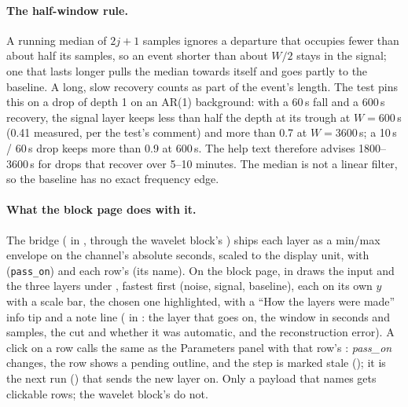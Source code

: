 \paragraph{The half-window rule.} A running median of $2j+1$ samples ignores a departure that
occupies fewer than about half its samples, so an event shorter than about $W/2$ stays in the
signal; one that lasts longer pulls the median towards itself and goes partly to the baseline.
A long, slow recovery counts as part of the event's length. The test
 pins this on a
drop of depth 1 on an AR(1) background: with a 60\,s fall and a 600\,s recovery, the signal
layer keeps less than half the depth at its trough at $W = 600$\,s (0.41 measured, per the
test's comment) and more than 0.7 at $W = 3600$\,s; a 10\,s / 60\,s drop keeps more than 0.9
at 600\,s. The help text therefore advises 1800--3600\,s for drops that recover over 5--10
minutes. The median is not a linear filter, so the baseline has no exact frequency edge.

\paragraph{What the block page does with it.} The bridge ( in
, through the wavelet block's ) ships each
layer as a min/max envelope on the channel's absolute seconds, scaled to the display unit,
with  (\texttt{pass\_on}) and each row's  (its name). On the
block page,  in 
draws the input and the three layers under , fastest first (noise, signal,
baseline), each on its own $y$ with a scale bar, the chosen one highlighted, with a ``How the
layers were made'' info tip and a note line ( in
: the layer that goes on, the window in
seconds and samples, the cut and whether it was automatic, and the reconstruction error). A
click on a row calls the same  as the Parameters panel with that row's
: \emph{pass\_on} changes, the row shows a pending outline, and the step is
marked stale (); it is the next run () that sends the new layer
on. Only a payload that names  gets clickable rows; the wavelet block's do
not.

